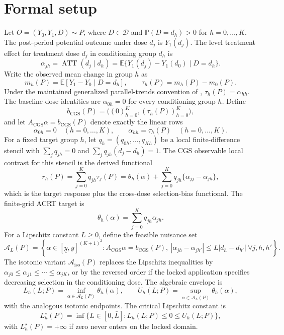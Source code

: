 \documentclass[11pt]{article}
\newcommand{\E}{\mathbb{E}}
\renewcommand{\Pr}{\mathbb{P}}
\theoremstyle{definition}
\theoremstyle{plain}
\theoremstyle{remark}
\begin{document}
\section{Formal setup}
Let \(O=(Y_0,Y_1,D)\sim P\), where \(D\in\mathcal D\) and
\(\Pr(D=d_h)>0\) for \(h=0,\ldots,K\).  The post-period potential outcome
under dose \(d_j\) is \(Y_1(d_j)\).  The level treatment effect for treatment
dose \(d_j\) in conditioning group \(d_h\) is
\[
  \alpha_{j h}=\operatorname{ATT}(d_j\mid d_h)
  =\E\{Y_1(d_j)-Y_1(d_0)\mid D=d_h\}.
\]
Write the observed mean change in group \(h\) as
\[
  m_h(P)=\E[Y_1-Y_0\mid D=d_h],
  \qquad
  \tau_h(P)=m_h(P)-m_0(P).
\]
Under the maintained generalized parallel-trends convention of
\citet[Sections 3--4]{CallawayGoodmanBaconSantAnna2021},
\(\tau_h(P)=\alpha_{h h}\).  The baseline-dose identities are
\(\alpha_{0h}=0\) for every conditioning group \(h\).  Define
\[
  b_{\mathrm{CGS}}(P)=
  \bigl((0)_{h=0}^K,(\tau_h(P))_{h=0}^K\bigr),
\]
and let \(A_{\mathrm{CGS}}\alpha=b_{\mathrm{CGS}}(P)\) denote exactly the
linear rows
\[
  \alpha_{0h}=0\quad(h=0,\ldots,K),
  \qquad
  \alpha_{hh}=\tau_h(P)\quad(h=0,\ldots,K).
\]
For a fixed target group \(h\), let \(q_h=(q_{0h},\ldots,q_{Kh})\) be a local
finite-difference stencil with \(\sum_jq_{jh}=0\) and
\(\sum_jq_{jh}(d_j-d_h)=1\).  The CGS observable local contrast for this
stencil is the derived functional
\[
  r_h(P)=\sum_{j=0}^K q_{jh}\tau_j(P)
       =\theta_h(\alpha)+\sum_{j=0}^K q_{jh}\{\alpha_{jj}-\alpha_{jh}\},
\]
which is the target response plus the cross-dose selection-bias functional.
The finite-grid ACRT target is
\[
  \theta_h(\alpha)=\sum_{j=0}^Kq_{j h}\alpha_{j h}.
\]
For a Lipschitz constant \(L\ge0\), define the feasible nuisance set
\[
\mathcal A_L(P)=
\left\{\alpha\in[\underline y,\overline y]^{(K+1)^2}:
 A_{\mathrm{CGS}}\alpha=b_{\mathrm{CGS}}(P),\
 |\alpha_{j h}-\alpha_{j h'}|\le L|d_h-d_{h'}|
 \ \forall j,h,h'\right\}.
\]
The isotonic variant \(\mathcal A_{\mathrm{iso}}(P)\) replaces the Lipschitz
inequalities by \(\alpha_{j0}\le\alpha_{j1}\le\cdots\le\alpha_{jK}\), or by
the reversed order if the locked application specifies decreasing selection in
the conditioning dose.  The algebraic envelope is
\[
  L_h(L;P)=\inf_{\alpha\in\mathcal A_L(P)}\theta_h(\alpha),\qquad
  U_h(L;P)=\sup_{\alpha\in\mathcal A_L(P)}\theta_h(\alpha),
\]
with the analogous isotonic endpoints.  The critical Lipschitz constant is
\[
  L_h^\star(P)=\inf\{L\in[0,\bar L]:L_h(L;P)\le0\le U_h(L;P)\},
\]
with \(L_h^\star(P)=+\infty\) if zero never enters on the locked domain.
\end{document}
